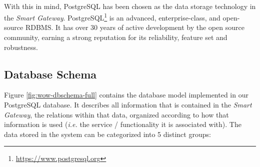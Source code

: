 \paragraph{} With this in mind, PostgreSQL has been chosen as the data storage technology in the \textit{Smart Gateway}. PostgreSQL\footnote{\url{https://www.postgresql.org}} is an advanced, enterprise-class, and open-source \acs{RDBMS}. It has over 30 years of active development by the open source community, earning a strong reputation for its reliability, feature set and robustness.

\subsection{Database Schema}
Figure \ref{fig:wow-dbschema-full} contains the database model implemented in our PostgreSQL database. It describes all information that is contained in the \textit{Smart Gateway}, the relations within that data, organized according to how that information is used (\textit{i.e.} the service / functionality it is associated with). The data stored in the system can be categorized into 5 distinct groups:

